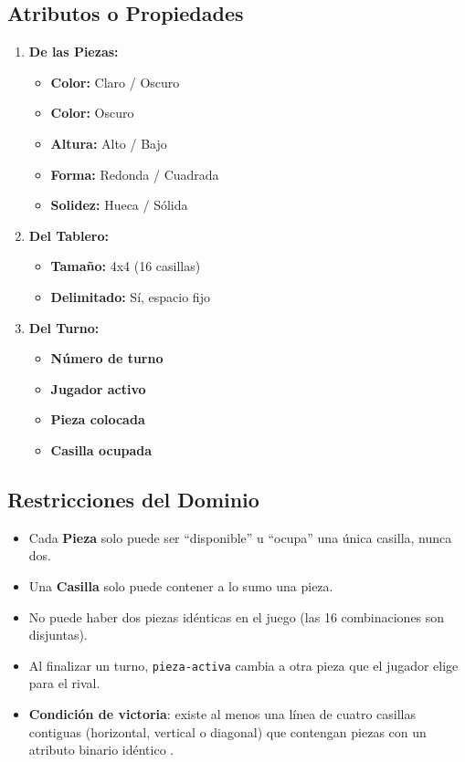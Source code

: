 \documentclass[conference]{IEEEtran}
\begin{document}
\subsection{Atributos o Propiedades}
\begin{enumerate}
	
\item \textbf{De las Piezas:}
	\begin{itemize}
		\item \textbf{Color:} Claro / Oscuro
		\item \textbf{Color:} Oscuro
		\item \textbf{Altura:} Alto / Bajo
		\item \textbf{Forma:} Redonda / Cuadrada
		\item \textbf{Solidez:} Hueca / Sólida
	\end{itemize}

	\item \textbf{Del Tablero:}
	\begin{itemize}
		\item \textbf{Tamaño:}  4x4 (16 casillas)
		\item \textbf{Delimitado:} Sí, espacio fijo
	\end{itemize}

	\item \textbf{Del Turno:}
	\begin{itemize}
		\item \textbf{Número de turno}
		\item \textbf{Jugador activo}
		\item \textbf{Pieza colocada}
		\item \textbf{Casilla ocupada}
	\end{itemize}
\end{enumerate}


\subsection{Restricciones del Dominio}

\begin{itemize}
\item Cada \textbf{Pieza} solo puede ser ``disponible'' u ``ocupa'' una única casilla, nunca dos.
\item Una \textbf{Casilla} solo puede contener a lo sumo una pieza.
\item No puede haber dos piezas idénticas en el juego (las 16 combinaciones son disjuntas).
\item Al finalizar un turno, \texttt{pieza-activa} cambia a otra pieza que el jugador elige para el rival.
\item \textbf{Condición de victoria}: existe al menos una línea de cuatro casillas contiguas (horizontal, vertical o diagonal) que contengan piezas con un atributo binario idéntico \cite{muller2009}.
\end{itemize}
\end{document}
